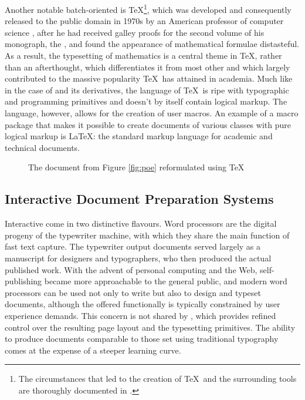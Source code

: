 \documentclass{book}
\begin{document}
Another notable batch-oriented  is \TeX{}\footnote{
  The circumstances that led to the creation of \TeX\ and the surrounding tools
  are thoroughly documented in \textcite{knuth98}.
}, which was developed and consequently released to the public domain in 1970s
by an American professor of computer science , after he had
received galley proofs for the second volume of his monograph, the , and found the appearance of mathematical formulae
distasteful. As a result, the typesetting of mathematics is a central theme in
\TeX, rather than an afterthought, which differentiates it from most other
 and which largely contributed to the massive popularity \TeX\ has
attained in academia. Much like in the case of  and its
derivatives, the language of \TeX\ is ripe with typographic and programming
primitives and doesn't by itself contain logical markup. The language, however,
allows for the creation of user macros. An example of a macro package that makes
it possible to create documents of various classes with pure logical markup is
\LaTeX{}: the standard markup language for academic and
technical documents.

\begin{figure}
  \caption{The  document from Figure \ref{fig:poe} reformulated
    using \TeX}
\end{figure}

\subsection{Interactive Document Preparation Systems}
Interactive  come in two distinctive flavours. Word processors
 are the digital progeny of the
typewriter machine, with which they share the main function of fast text
capture. The typewriter output documents served largely as a manuscript for
designers and typographers, who then produced the actual published work. With
the advent of personal computing and the Web, self-publishing became more
approachable to the general public, and modern word processors can be used not
only to write but also to design and typeset documents, although the offered
functionally is typically constrained by user experience demands. This concern
is not shared by , which provides
refined control over the resulting page layout and the typesetting primitives.
The ability to produce documents comparable to those set using traditional
typography comes at the expense of a steeper learning curve.
\end{document}
